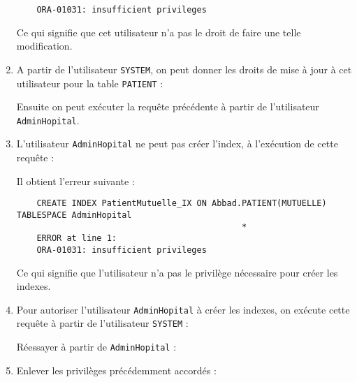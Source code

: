 \documentclass[12pt,a4paper]{article}
\begin{document}
\begin{enumerate}
\begin{verbatim}
	ORA-01031: insufficient privileges
	\end{verbatim}
	Ce qui signifie que cet utilisateur n'a pas le droit de faire une telle modification.
	\item A partir de l'utilisateur \texttt{SYSTEM}, on peut donner les droits de mise à jour à cet utilisateur
	pour la table \texttt{PATIENT} :
	
	Ensuite on peut exécuter la requête précédente à partir de l'utilisateur \texttt{AdminHopital}.
	
	\item L'utilisateur \texttt{AdminHopital} ne peut pas créer l'index, à l'exécution de cette requête :
	
	Il obtient l'erreur suivante :
	\begin{verbatim}
	CREATE INDEX PatientMutuelle_IX ON Abbad.PATIENT(MUTUELLE) TABLESPACE AdminHopital
	                                         *
	ERROR at line 1:
	ORA-01031: insufficient privileges
	\end{verbatim}
	Ce qui signifie que l'utilisateur n'a pas le privilège nécessaire pour créer les indexes.
	\item Pour autoriser l'utilisateur \texttt{AdminHopital} à créer les indexes, on exécute cette requête
	à partir de l'utilisateur \texttt{SYSTEM} :
	
	Réessayer à partir de \texttt{AdminHopital} :
	
	\item Enlever les privilèges précédemment accordés :
	
\end{enumerate}
\end{document}
